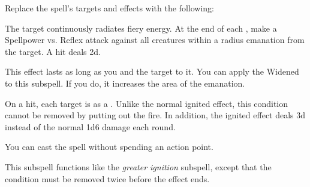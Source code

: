 Replace the spell's targets and effects with the following:
\begin{spellcontent}

\begin{augmenttargetinginfo}



\end{augmenttargetinginfo}


\begin{augmenteffects}



\spelleffect
The target continuously radiates fiery energy.
At the end of each , make a Spellpower vs. Reflex attack against all creatures within a \areamed radius emanation from the target.
A hit deals  \minus2d.

This effect lasts as long as you and the target  to it.
You can apply the Widened  to this subspell.
If you do, it increases the area of the emanation.








\end{augmenteffects}

\end{spellcontent}






On a hit, each target is  as a .
Unlike the normal ignited effect, this condition cannot be removed by putting out the fire.
In addition, the ignited effect deals  \minus3d instead of the normal 1d6 damage each round.






You can cast the spell without spending an action point.






This subspell functions like the \textit{greater ignition} subspell, except that the condition must be removed twice before the effect ends.






